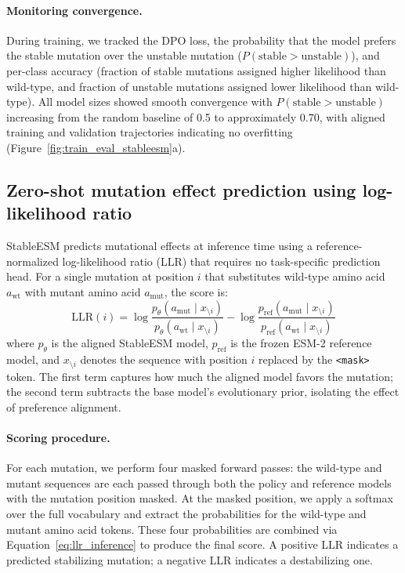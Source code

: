\paragraph{Monitoring convergence.}
During training, we tracked the DPO loss, the probability that the model prefers the stable mutation over the unstable mutation ($P(\text{stable} > \text{unstable})$), and per-class accuracy (fraction of stable mutations assigned higher likelihood than wild-type, and fraction of unstable mutations assigned lower likelihood than wild-type).
All model sizes showed smooth convergence with $P(\text{stable} > \text{unstable})$ increasing from the random baseline of 0.5 to approximately 0.70, with aligned training and validation trajectories indicating no overfitting (Figure~\ref{fig:train_eval_stableesm}a).

\subsection{Zero-shot mutation effect prediction using log-likelihood ratio}\label{sec:llr_prediction}

StableESM predicts mutational effects at inference time using a reference-normalized log-likelihood ratio (LLR) that requires no task-specific prediction head.
For a single mutation at position $i$ that substitutes wild-type amino acid $a_{\text{wt}}$ with mutant amino acid $a_{\text{mut}}$, the score is:
\begin{equation}\label{eq:llr_inference}
\text{LLR}(i) = \log \frac{p_\theta(a_{\text{mut}} \mid x_{\setminus i})}{p_\theta(a_{\text{wt}} \mid x_{\setminus i})} - \log \frac{p_{\text{ref}}(a_{\text{mut}} \mid x_{\setminus i})}{p_{\text{ref}}(a_{\text{wt}} \mid x_{\setminus i})}
\end{equation}
where $p_\theta$ is the aligned StableESM model, $p_{\text{ref}}$ is the frozen ESM-2 reference model, and $x_{\setminus i}$ denotes the sequence with position $i$ replaced by the \texttt{<mask>} token.
The first term captures how much the aligned model favors the mutation; the second term subtracts the base model's evolutionary prior, isolating the effect of preference alignment.

\paragraph{Scoring procedure.}
For each mutation, we perform four masked forward passes: the wild-type and mutant sequences are each passed through both the policy and reference models with the mutation position masked.
At the masked position, we apply a softmax over the full vocabulary and extract the probabilities for the wild-type and mutant amino acid tokens.
These four probabilities are combined via Equation~\ref{eq:llr_inference} to produce the final score.
A positive LLR indicates a predicted stabilizing mutation; a negative LLR indicates a destabilizing one.

